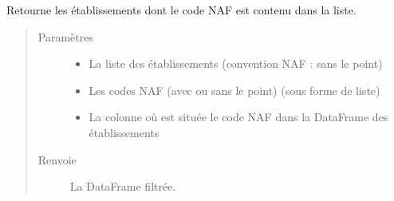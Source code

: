 \documentclass[letterpaper,10pt,french]{sphinxmanual}
\begin{document}
\begin{fulllineitems}
\label{\detokenize{index:src.clusterizer.utils.NAF_utils.filter_by_naf}}
\sphinxAtStartPar
Retourne les établissements dont le code NAF est contenu dans la liste.
\begin{quote}\begin{description}
\item[{Paramètres}] \leavevmode\begin{itemize}
\item {} 
\sphinxAtStartPar
{} \textendash{} La liste des établissements (convention NAF : sans le point)

\item {} 
\sphinxAtStartPar
{} \textendash{} Les codes NAF (avec ou sans le point) (sous forme de liste)

\item {} 
\sphinxAtStartPar
{} \textendash{} La colonne où est située le code NAF dans la DataFrame des établissements

\end{itemize}

\item[{Renvoie}] \leavevmode
\sphinxAtStartPar
La DataFrame filtrée.

\end{description}\end{quote}

\end{fulllineitems}

\end{document}
